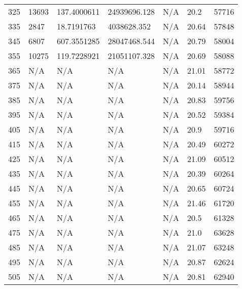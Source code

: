 \begin{tabular}{lllllll}
325  & 13693           & 137.4000611    & 24939696.128     & N/A            & 20.2          & 57716           \\
335  & 2847            & 18.7191763     & 4038628.352      & N/A            & 20.64         & 57848           \\
345  & 6807            & 607.3551285    & 28047468.544     & N/A            & 20.79         & 58004           \\
355  & 10275           & 119.7228921    & 21051107.328     & N/A            & 20.69         & 58088           \\
365  & N/A             & N/A            & N/A              & N/A            & 21.01         & 58772           \\
375  & N/A             & N/A            & N/A              & N/A            & 20.14         & 58944           \\
385  & N/A             & N/A            & N/A              & N/A            & 20.83         & 59756           \\
395  & N/A             & N/A            & N/A              & N/A            & 20.52         & 59384           \\
405  & N/A             & N/A            & N/A              & N/A            & 20.9          & 59716           \\
415  & N/A             & N/A            & N/A              & N/A            & 20.49         & 60272           \\
425  & N/A             & N/A            & N/A              & N/A            & 21.09         & 60512           \\
435  & N/A             & N/A            & N/A              & N/A            & 20.39         & 60264           \\
445  & N/A             & N/A            & N/A              & N/A            & 20.65         & 60724           \\
455  & N/A             & N/A            & N/A              & N/A            & 21.46         & 61720           \\
465  & N/A             & N/A            & N/A              & N/A            & 20.5          & 61328           \\
475  & N/A             & N/A            & N/A              & N/A            & 21.0          & 63628           \\
485  & N/A             & N/A            & N/A              & N/A            & 21.07         & 63248           \\
495  & N/A             & N/A            & N/A              & N/A            & 20.87         & 62624           \\
505  & N/A             & N/A            & N/A              & N/A            & 20.81         & 62940          
\end{tabular}